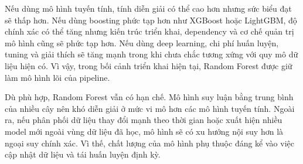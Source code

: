 Nếu dùng mô hình tuyến tính, tính diễn giải có thể cao hơn nhưng sức biểu đạt sẽ thấp hơn. Nếu dùng boosting phức tạp hơn như XGBoost hoặc LightGBM, độ chính xác có thể tăng nhưng kiến trúc triển khai, dependency và cơ chế quản trị mô hình cũng sẽ phức tạp hơn. Nếu dùng deep learning, chi phí huấn luyện, tuning và giải thích sẽ tăng mạnh trong khi chưa chắc tương xứng với quy mô dữ liệu hiện có. Vì vậy, trong bối cảnh triển khai hiện tại, Random Forest được giữ làm mô hình lõi của pipeline.


Dù phù hợp, Random Forest vẫn có hạn chế. Mô hình suy luận bằng trung bình của nhiều cây nên khó diễn giải ở mức vi mô hơn các mô hình tuyến tính. Ngoài ra, nếu phân phối dữ liệu thay đổi mạnh theo thời gian hoặc xuất hiện nhiều model mới ngoài vùng dữ liệu đã học, mô hình sẽ có xu hướng nội suy hơn là ngoại suy chính xác. Vì thế, chất lượng của mô hình phụ thuộc đáng kể vào việc cập nhật dữ liệu và tái huấn luyện định kỳ.
